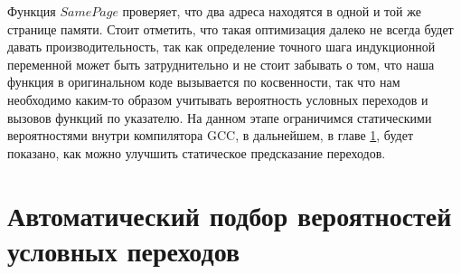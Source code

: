 Функция $SamePage$ проверяет, что два адреса находятся в одной и той же странице памяти. Стоит отметить, что такая оптимизация далеко не всегда будет давать производительность, так как определение точного шага индукционной переменной может быть затруднительно и не стоит забывать о том, что наша функция в оригинальном коде вызывается по косвенности, так что нам необходимо каким-то образом учитывать вероятность условных переходов и вызовов функций по указателю. На данном этапе ограничимся статическими вероятностями внутри компилятора GCC, в дальнейшем, в главе \ref{op:mlpgo}, будет показано, как можно улучшить статическое предсказание переходов. 


\section{Автоматический подбор вероятностей условных переходов}  \label{op:mlpgo}

